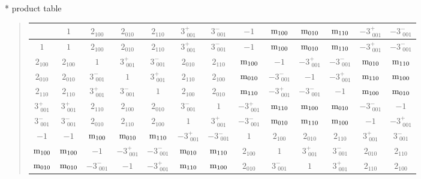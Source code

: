 \documentclass[fleqn,10pt,landscape]{jsarticle}
\begin{document}
* product table
\begin{quote}
\begin{tabular}{ccccccccccccc} \hline \hline
 & $ 1 $ & $ 2{}_{100} $ & $ 2{}_{010} $ & $ 2{}_{110} $ & $ 3^{+}_{\,\,001} $ & $ 3^{-}_{\,\,001} $ & $ -1 $ & $ {\rm m}_{100} $ & $ {\rm m}_{010} $ & $ {\rm m}_{110} $ & $ -3^{+}_{\,\,001} $ & $ -3^{-}_{\,\,001} $ \\ \hline
$ 1 $ & $ 1 $ & $ 2{}_{100} $ & $ 2{}_{010} $ & $ 2{}_{110} $ & $ 3^{+}_{\,\,001} $ & $ 3^{-}_{\,\,001} $ & $ -1 $ & $ {\rm m}_{100} $ & $ {\rm m}_{010} $ & $ {\rm m}_{110} $ & $ -3^{+}_{\,\,001} $ & $ -3^{-}_{\,\,001} $ \\
$ 2{}_{100} $ & $ 2{}_{100} $ & $ 1 $ & $ 3^{+}_{\,\,001} $ & $ 3^{-}_{\,\,001} $ & $ 2{}_{010} $ & $ 2{}_{110} $ & $ {\rm m}_{100} $ & $ -1 $ & $ -3^{+}_{\,\,001} $ & $ -3^{-}_{\,\,001} $ & $ {\rm m}_{010} $ & $ {\rm m}_{110} $ \\
$ 2{}_{010} $ & $ 2{}_{010} $ & $ 3^{-}_{\,\,001} $ & $ 1 $ & $ 3^{+}_{\,\,001} $ & $ 2{}_{110} $ & $ 2{}_{100} $ & $ {\rm m}_{010} $ & $ -3^{-}_{\,\,001} $ & $ -1 $ & $ -3^{+}_{\,\,001} $ & $ {\rm m}_{110} $ & $ {\rm m}_{100} $ \\
$ 2{}_{110} $ & $ 2{}_{110} $ & $ 3^{+}_{\,\,001} $ & $ 3^{-}_{\,\,001} $ & $ 1 $ & $ 2{}_{100} $ & $ 2{}_{010} $ & $ {\rm m}_{110} $ & $ -3^{+}_{\,\,001} $ & $ -3^{-}_{\,\,001} $ & $ -1 $ & $ {\rm m}_{100} $ & $ {\rm m}_{010} $ \\
$ 3^{+}_{\,\,001} $ & $ 3^{+}_{\,\,001} $ & $ 2{}_{110} $ & $ 2{}_{100} $ & $ 2{}_{010} $ & $ 3^{-}_{\,\,001} $ & $ 1 $ & $ -3^{+}_{\,\,001} $ & $ {\rm m}_{110} $ & $ {\rm m}_{100} $ & $ {\rm m}_{010} $ & $ -3^{-}_{\,\,001} $ & $ -1 $ \\
$ 3^{-}_{\,\,001} $ & $ 3^{-}_{\,\,001} $ & $ 2{}_{010} $ & $ 2{}_{110} $ & $ 2{}_{100} $ & $ 1 $ & $ 3^{+}_{\,\,001} $ & $ -3^{-}_{\,\,001} $ & $ {\rm m}_{010} $ & $ {\rm m}_{110} $ & $ {\rm m}_{100} $ & $ -1 $ & $ -3^{+}_{\,\,001} $ \\
$ -1 $ & $ -1 $ & $ {\rm m}_{100} $ & $ {\rm m}_{010} $ & $ {\rm m}_{110} $ & $ -3^{+}_{\,\,001} $ & $ -3^{-}_{\,\,001} $ & $ 1 $ & $ 2{}_{100} $ & $ 2{}_{010} $ & $ 2{}_{110} $ & $ 3^{+}_{\,\,001} $ & $ 3^{-}_{\,\,001} $ \\
$ {\rm m}_{100} $ & $ {\rm m}_{100} $ & $ -1 $ & $ -3^{+}_{\,\,001} $ & $ -3^{-}_{\,\,001} $ & $ {\rm m}_{010} $ & $ {\rm m}_{110} $ & $ 2{}_{100} $ & $ 1 $ & $ 3^{+}_{\,\,001} $ & $ 3^{-}_{\,\,001} $ & $ 2{}_{010} $ & $ 2{}_{110} $ \\
$ {\rm m}_{010} $ & $ {\rm m}_{010} $ & $ -3^{-}_{\,\,001} $ & $ -1 $ & $ -3^{+}_{\,\,001} $ & $ {\rm m}_{110} $ & $ {\rm m}_{100} $ & $ 2{}_{010} $ & $ 3^{-}_{\,\,001} $ & $ 1 $ & $ 3^{+}_{\,\,001} $ & $ 2{}_{110} $ & $ 2{}_{100} $ \\

\end{tabular}
\end{quote}
\end{document}
